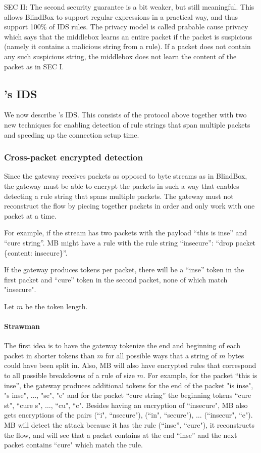 SEC II: The second security guarantee is a bit weaker, but still meaningful. This allows BlindBox
to support regular expressions in a practical way, and thus support 100\% of IDS rules. 
The privacy model is called prabable cause privacy which says that the middlebox
learns an entire packet if the packet is suspicious (namely it contains a  malicious string from a rule). 
If a packet does not contain any such suspicious string, the middlebox does not learn the content of the packet as 
in SEC I. 



\subsection{\sys's IDS}\label{sec:IDS}

We now describe \sys's IDS. This consists of the protocol above together with two new techniques 
for enabling detection of rule strings that span multiple packets and speeding up the connection
setup time. 


\subsubsection{Cross-packet encrypted detection}

Since the gateway receives packets as opposed to byte streams as in BlindBox, the gateway
must be able to encrypt the packets in such a way that enables detecting a rule string that
spans multiple packets. The gateway must not reconstruct the flow by piecing together packets in order
and only work with one packet at a time.

For example, if the stream has two packets with the payload
``this is inse'' and ``cure string''. MB might have a rule with the rule string ``insecure'': 
``drop packet \{content: insecure\}''.  

If the gateway produces tokens per packet, there will be a ``inse'' token in the first packet
and ``cure'' token in the second packet, none of which match "insecure". 

 Let $m$ be the token length.
 
 \paragraph{Strawman} The first idea is to have the gateway tokenize the end and beginning of each 
 packet in shorter tokens than $m$ for all possible ways that a string of $m$ bytes could have been split in.
 Also, MB will also have encrypted rules that correspond to all possible breakdowns
 of a rule of size $m$. 
 For example, for the packet ``this is inse'', the gateway produces additional tokens for the end of the packet
 "is inse", "s inse", $\dots$, "se", "e" and for the packet ``cure string'' the beginning tokens ``cure st", ``cure s", $\dots$,  ``cu", ``c".
 Besides having an encryption of ``insecure", MB also gets encryptions of the pairs (``i", ``nsecure"), (``in", ``secure"), 
 $\dots$ (``insecur", ``e").
 MB will detect the attack because it has the rule (``inse'', ``cure"), it reconstructs the flow, and will see that a packet contains at the end ``inse'' and the next packet
 contains ``cure" which match the rule. 
 
